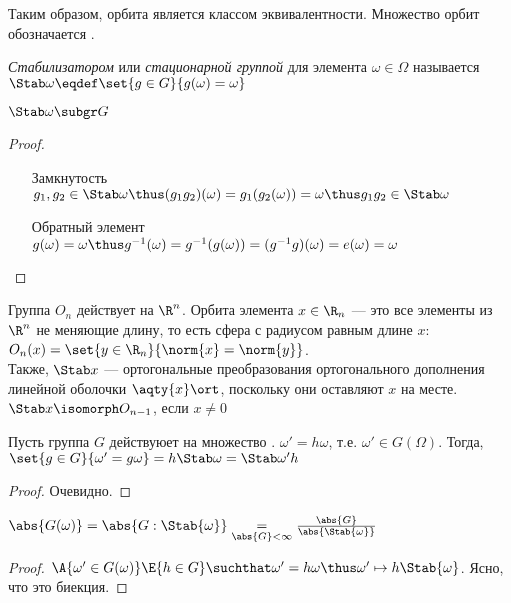\begin{denotation}
  Таким образом, орбита является классом эквивалентности. Множество орбит обозначается .
\end{denotation}

\begin{definition}
  \emph{Стабилизатором} или \emph{стационарной группой} для элемента $\omega\in\Omega$ называется $\Stab \omega \eqdef\set{g\in G}{g(\omega)=\omega}$
\end{definition}

\begin{theorem}
  $\Stab \omega \subgr G$
\end{theorem}
\begin{proof}
  \theoremlistshack
  \begin{itemize}[leftmargin=22ex, align=left, labelwidth=20ex]
    \item [Замкнутость] $g_1,g_2\in \Stab\omega\thus (g_1g_2)(\omega)=g_1(g_2(\omega))=\omega\thus g_1g_2\in \Stab\omega$
    \item [Обратный элемент] $g(\omega)=\omega\thus g^{-1}(\omega)=g^{-1}(g(\omega))=(g^{-1} g)(\omega)=e(\omega)=\omega$
  \end{itemize}
\end{proof}

\begin{example}
  Группа $O_n$ действует на $\R^n$. Орбита элемента $x\in \R_n$ --- это все элементы из $\R^n$ не меняющие длину, то есть сфера с радиусом равным длине $x$: $O_n(x)=\set{y\in \R_n}{\norm{x}=\norm{y}}$.\\
  Также, $\Stab x$ --- ортогональные преобразования ортогонального дополнения линейной оболочки $\aqty{x}\ort$, поскольку они оставляют $x$ на месте. $\Stab x\isomorph O_{n-1}$, если $x\neq0$
\end{example}

\begin{theorem}
  Пусть группа $G$ действуюет на множество \Omega. $\omega'=h\omega$, т.\:е. $\omega'\in G(\Omega)$. Тогда, $\set{g\in G}{\omega'=g\omega}=h\Stab\omega=\Stab\omega' h$
\end{theorem}
\begin{proof}
  Очевидно.
\end{proof}

\begin{theorem}
  $\abs{G(\omega)}=\abs{G:\Stab{\omega}}\underset{\abs{G}<\infty}{=}\frac{\abs{G}}{\abs{\Stab{\omega}}}$
\end{theorem}
\begin{proof}
  $\A{\omega'\in G(\omega)}\E{h\in G}\suchthat \omega'=h\omega\thus \omega'\mapsto h\Stab{\omega}$. Ясно, что это биекция.
\end{proof}

